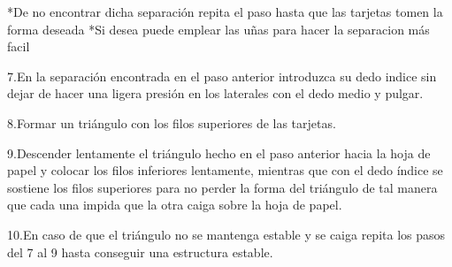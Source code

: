 \documentclass{article}
\begin{document}
*De no encontrar dicha separación repita el paso hasta que las tarjetas tomen la forma deseada
*Si desea puede emplear las uñas para hacer la separacion más facil

7.En la separación encontrada en el paso anterior introduzca su dedo indice sin dejar de hacer una ligera presión en los laterales con el dedo medio y pulgar.

8.Formar un triángulo con los filos superiores de las tarjetas.

9.Descender lentamente el triángulo hecho en el paso anterior hacia la hoja de papel y colocar los filos inferiores lentamente, mientras que con el dedo índice se sostiene los filos superiores para no perder la forma del triángulo de tal manera que cada una impida que la otra caiga sobre la hoja de papel.

10.En caso de que el triángulo no se mantenga estable y se caiga repita los pasos del 7 al 9 hasta conseguir una estructura estable.
\end{document}
